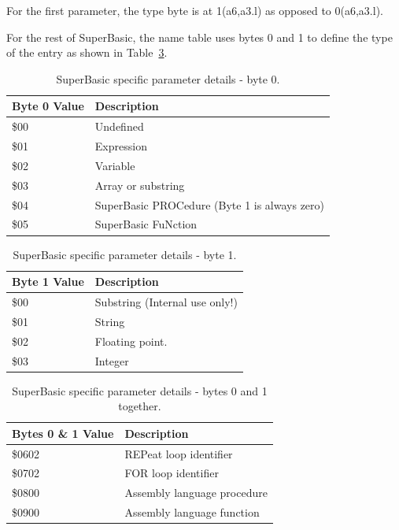 For the first parameter, the type byte is at 1(a6,a3.l) as opposed
    to 0(a6,a3.l).

For the rest of SuperBasic, the name table uses bytes 0 and 1 to
    define the type of the entry as shown in  Table~\ref{tab:SuperBasicParameterDetailsByte0And1}.

\begin{table}[htbp]
\centering
\begin{tabular}{l l}  %
\toprule
\textbf{Byte 0 Value} & \textbf{Description} \\
\midrule
%
\$00 & Undefined\\
\$01 & Expression\\
\$02 & Variable\\
\$03 & Array or substring\\
\$04 & SuperBasic PROCedure (Byte 1 is always zero)\\
\$05 & SuperBasic FuNction\\
%
\bottomrule
\end{tabular}
\caption{SuperBasic specific parameter details -{} byte 0.}
\label{tab:SuperBasicParameterDetailsByte0}
\end{table}

\begin{table}[htbp]
\centering
\begin{tabular}{l l}  %
\toprule
\textbf{Byte 1 Value} & \textbf{Description} \\
\midrule
%
\$00 & Substring (Internal use only!)\\
\$01 & String\\
\$02 & Floating point.\\
\$03 & Integer\\
%
\bottomrule
\end{tabular}
\caption{SuperBasic specific parameter details -{} byte 1.}
\label{tab:SuperBasicParameterDetailsByte1}
\end{table}

\begin{table}[htbp]
\centering
\begin{tabular}{l l}  %
\toprule
\textbf{Bytes 0 \& 1 Value} & \textbf{Description} \\
\midrule
%
\$0602 & REPeat loop identifier\\
\$0702 & FOR loop identifier\\
\$0800 & Assembly language procedure\\
\$0900 & Assembly language function\\
%
\bottomrule
\end{tabular}
\caption{SuperBasic specific parameter details -{} bytes 0 and 1 together.}
\label{tab:SuperBasicParameterDetailsByte0And1}
\end{table}


